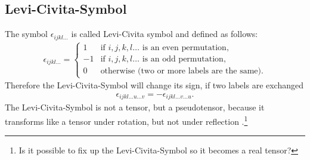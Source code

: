 \subsection{Levi-Civita-Symbol}
The symbol $\epsilon_{ijkl\ldots}$ is called Levi-Civita symbol and defined as
follows:
\begin{align}
\epsilon_{ijkl\ldots}=
\begin{cases} 	 1 & \text{if $i,j,k,l\ldots$ is an even permutation}, \\
					-1 & \text{if $i,j,k,l\ldots$ is an odd permutation}, \\
					 0 & \text{otherwise (two or more labels are the same)}.
\end{cases}				  
\end{align}
Therefore the Levi-Civita-Symbol will change its sign, if two labels are
exchanged
\begin{align*}
\epsilon_{ijkl\ldots u \ldots v} = -\epsilon_{ijkl\ldots v \ldots u}.
\end{align*}
The Levi-Civita-Symbol is not a tensor, but a pseudotensor, because it
transforms like a tensor under rotation, but not under reflection
\citep{Pope2000}.\footnote{Is it possible to fix up the Levi-Civita-Symbol so
it becomes a real tensor?}

